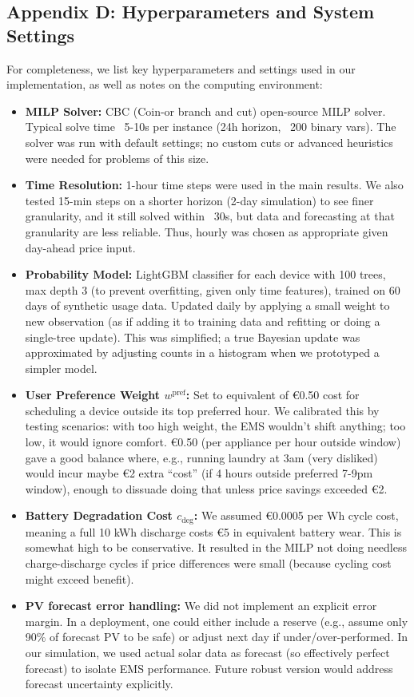 \documentclass[12pt,a4paper]{article}
\begin{document}
\subsection*{Appendix D: Hyperparameters and System Settings}
For completeness, we list key hyperparameters and settings used in our implementation, as well as notes on the computing environment:
\begin{itemize}
    \item \textbf{MILP Solver:} CBC (Coin-or branch and cut) open-source MILP solver. Typical solve time ~5-10s per instance (24h horizon, ~200 binary vars). The solver was run with default settings; no custom cuts or advanced heuristics were needed for problems of this size.
    \item \textbf{Time Resolution:} 1-hour time steps were used in the main results. We also tested 15-min steps on a shorter horizon (2-day simulation) to see finer granularity, and it still solved within ~30s, but data and forecasting at that granularity are less reliable. Thus, hourly was chosen as appropriate given day-ahead price input.
    \item \textbf{Probability Model:} LightGBM classifier for each device with 100 trees, max depth 3 (to prevent overfitting, given only time features), trained on 60 days of synthetic usage data. Updated daily by applying a small weight to new observation (as if adding it to training data and refitting or doing a single-tree update). This was simplified; a true Bayesian update was approximated by adjusting counts in a histogram when we prototyped a simpler model.
    \item \textbf{User Preference Weight $w^{\text{pref}}$:} Set to equivalent of €0.50 cost for scheduling a device outside its top preferred hour. We calibrated this by testing scenarios: with too high weight, the EMS wouldn’t shift anything; too low, it would ignore comfort. €0.50 (per appliance per hour outside window) gave a good balance where, e.g., running laundry at 3am (very disliked) would incur maybe €2 extra “cost” (if 4 hours outside preferred 7-9pm window), enough to dissuade doing that unless price savings exceeded €2.
    \item \textbf{Battery Degradation Cost $c_{\text{deg}}$:} We assumed €0.0005 per Wh cycle cost, meaning a full 10 kWh discharge costs €5 in equivalent battery wear. This is somewhat high to be conservative. It resulted in the MILP not doing needless charge-discharge cycles if price differences were small (because cycling cost might exceed benefit).
    \item \textbf{PV forecast error handling:} We did not implement an explicit error margin. In a deployment, one could either include a reserve (e.g., assume only 90\% of forecast PV to be safe) or adjust next day if under/over-performed. In our simulation, we used actual solar data as forecast (so effectively perfect forecast) to isolate EMS performance. Future robust version would address forecast uncertainty explicitly.

\end{itemize}
\end{document}
